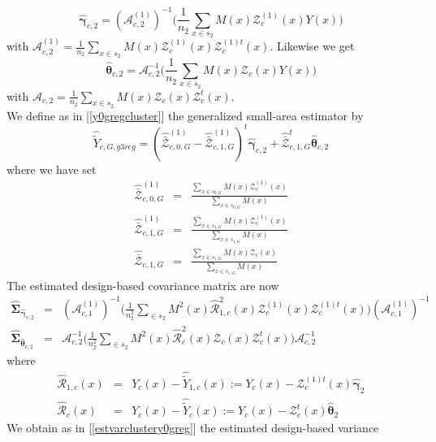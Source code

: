 \documentclass[a4paper,12pt,leqno, titlepage]{article}
\begin{document}
\begin{equation}\label{regbettaclusterext}
\hat{\pmb{\gamma}}_{c,2}=(\pmb{\mathcal{A}}_{c,2}^{(1)})^{-1}\Big(\frac{1}{n_2}\sum_{x\in{s_2}}M(x)
\pmb{\mathcal{Z}}^{(1)}_c(x)Y(x)\Big)
\end{equation}
with $\pmb{\mathcal{A}}_{c,2}^{(1)}=\frac{1}{n_2}\sum_{x\in{s_2}}M(x)
\pmb{\mathcal{Z}}^{(1)}_c(x)\pmb{\mathcal{Z}}^{(1)t}_c(x)$. Likewise we get
\begin{equation}\label{regbettaclusterext}
\hat{\pmb{\theta}}_{c,2}=\pmb{\mathcal{A}}^{-1}_{c,2}\Big(\frac{1}{n_2}\sum_{x\in{s_2}}M(x)
\pmb{\mathcal{Z}}_c(x)Y(x)\Big)
\end{equation}
with $\pmb{\mathcal{A}}_{c,2}=\frac{1}{n_2}\sum_{x\in{s_2}}M(x)\pmb{\mathcal{Z}}_c(x)\pmb{\mathcal{Z}}^t_c(x)$.\\
We define as in [\ref{y0gregcluster}] the generalized small-area estimator by
\begin{equation}\label{extclustersmallareaY_0greg}
\hat{\tilde{Y}}_{c,G,g3reg}
= (\hat{\bar{\pmb{\mathcal{Z}}}}_{c,0,G}^{(1)}-\hat{\bar{\pmb{\mathcal{Z}}}}_{c,1,G}^{(1)})^t\hat{\pmb{\gamma}}_{c,2} +
\hat{\bar{\pmb{\mathcal{Z}}}}_{c,1,G}^t\hat{\pmb{\theta}}_{c,2}
\end{equation}
where we have set
\begin{eqnarray*}
 \hat{\bar{\pmb{\mathcal{Z}}}}^{(1)}_{c,0,G}&=&\frac{\sum_{x\in{s_{0,G}}}M(x)\mathcal{Z}_c^{(1)}(x)}{\sum_{x\in{s_{0,G}}}M(x)} \\ \hat{\bar{\pmb{\mathcal{Z}}}}_{c,1,G}^{(1)}&=&
 \frac{\sum_{x\in{s_{1,G}}}M(x)\pmb{\mathcal{Z}}_c^{(1)}(x)}{\sum_{x\in{s_{1,G}}}M(x)} \\
 \hat{\bar{\pmb{\mathcal{Z}}}}_{c,1,G}&=&
 \frac{\sum_{x\in{s_{1,G}}}M(x)\pmb{\mathcal{Z}}_c(x)}{\sum_{x\in{s_{1,G}}}M(x)}
\end{eqnarray*}
The estimated design-based covariance matrix are now
\begin{eqnarray}\label{gammathetaclusterextestvar}
\hat{\pmb{\Sigma}}_{\hat{\pmb{\gamma}}_{c,2}}&=&
(\pmb{\mathcal{A}}^{(1)}_{c,1})^{-1}\Big(\frac{1}{n^2_2}\sum_{\in{s_2}}M^2(x)\hat{\mathcal{R}}_{1,c}^2(x)
\pmb{\mathcal{Z}}^{(1)}_c(x)\pmb{\mathcal{Z}}^{(1)t}_c(x)\Big)(\pmb{\mathcal{A}}^{(1)}_{c,1})^{-1}\nonumber \\
\hat{\pmb{\Sigma}}_{\hat{\pmb{\theta}}_{c,2}}&=&
\pmb{\mathcal{A}}^{-1}_{c,2}\Big(\frac{1}{n^2_2}\sum_{\in{s_2}}M^2(x)\hat{\mathcal{R}}_c^2(x)
\pmb{\mathcal{Z}}_c(x)\pmb{\mathcal{Z}}^t_c(x)\Big)\pmb{\mathcal{A}}^{-1}_{c,2}
\end{eqnarray}
\noindent where
\begin{eqnarray*}
\hat{\mathcal{R}}_{1,c}(x)&=&Y_c(x)-\hat{\tilde{Y}}_{1,c}(x):=Y_c(x)-\pmb{\mathcal{Z}}^{(1)t}_c(x)\hat{\pmb{\gamma}}_2\\
\hat{\mathcal{R}}_{c}(x)&=&Y_c(x)-\hat{\tilde{Y}}_c(x):=Y_c(x)-\pmb{\mathcal{Z}}^{t}_c(x)\hat{\pmb{\theta}}_2
\end{eqnarray*}
We obtain as in [\ref{estvarclustery0greg}] the estimated design-based variance
\end{document}
